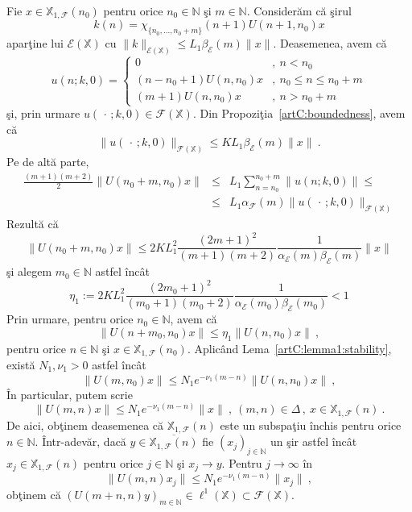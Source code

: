 \documentclass[ a4paper, 12pt]{report}
\newcommand{\E}{\mathcal{E}}
\newcommand{\F}{\mathcal{F}}
\newcommand{\N}{\mathbb{N}}
\newcommand{\X}{\mathbb{X}}
\theoremstyle{definition}
\theoremstyle{remark}
\numberwithin{equation}{section}
\begin{document}
Fie $x\in\X_{1,\F}(n_0)$ pentru orice $n_0\in\N$ \c si $m\in\N$. Consider\u am c\u a \c sirul
\begin{equation}
k(n)=\chi_{\{n_0,..., n_0+m\}}(n+1)U(n+1,n_0)x
\end{equation}
apar\c tine lui $\E(\X)$ cu $\|k\|_{\E(\X)}\leq L_1\beta_{\E}(m)\|x\|$. Deasemenea, avem c\u a
\begin{equation}
u(n;k,0) = \begin{cases}
0 &,\ n<n_0\\
(n-n_0+1) U(n,n_0)x &,\ n_0\leq n\leq n_0+m\\
(m+1) U(n,n_0)x &,\ n>n_0+m
\end{cases}
\end{equation}
\c si, prin urmare $u(\,\cdot\,;k,0)\in\F(\X)$. Din Propozi\c tia~\ref{artC:boundedness}, avem c\u a
$$\|u(\,\cdot\,;k,0)\|_{\F(\X)}\leq KL_1 \beta_{\E}(m)\|x\|\ .$$
Pe de alt\u a parte,
\begin{eqnarray*}
\frac{(m+1)(m+2)}{2}\|U(n_0+m,n_0)x\| &\leq& L_1 \sum_{n=n_0}^{n_0+m} \|u(n;k,0)\| \leq \\
&\leq&L_1\alpha_{\F}(m) \|u(\,\cdot\,;k,0)\|_{\F(\X)}
\end{eqnarray*}
Rezult\u a c\u a
\begin{equation}
\|U(n_0+m,n_0)x\|\leq 2KL_1^2 \frac{(2m+1)^2}{(m+1)(m+2)}\frac{1}{\alpha_{\E}(m)\beta_{\E}(m)}\|x\|
\end{equation}
\c si alegem $m_0\in\N$ astfel \^inc\^at
$$\eta_1:= 2KL_1^2 \frac{(2m_0+1)^2}{(m_0+1)(m_0+2)}\frac{1}{\alpha_{\E}(m_0)\beta_{\E}(m_0)} <1 $$
Prin urmare, pentru orice $n_0\in\N$, avem c\u a
$$\|U(n+m_0,n_0)x\|\leq \eta_1 \|U(n,n_0)x\|\ ,$$
pentru orice $n\in\N$ \c si $x\in\X_{1,\F}(n_0)$.
Aplic\^and Lema~\ref{artC:lemma1:stability}, exist\u a  $N_1,\nu_1>0$ astfel \^inc\^at
$$\|U(m,n_0)x\|\leq N_1e^{-\nu_1(m-n)}\|U(n,n_0)x\|\ ,$$
\^In particular, putem scrie
\begin{equation}
\|U(m,n)x\|\leq N_1e^{-\nu_1 (m-n)}\|x\|\ ,\ (m,n)\in\Delta\,,\ x\in\X_{1,\F}(n)\ .
\end{equation}
De aici, ob\c tinem deasemenea c\u a $\X_{1,\F}(n)$ este un subspa\c tiu \^inchis pentru orice $n\in\N$.
\^Intr-adev\u ar, dac\u a $y\in\overline{\X_{1,\F}(n)}$ fie $(x_j)_{j\in\N}$ un \c sir astfel \^inc\^at
$x_j\in\X_{1,\F}(n)$ pentru orice $j\in\N$ \c si $x_j\to y$. Pentru $j\to\infty$ \^in
$$\|U(m,n)x_j\|\leq N_1e^{-\nu_1 (m-n)}\|x_j\|\ ,$$
ob\c tinem c\u a  $(U(m+n,n)y)_{m\in\N}\in\ell^1(\X)\subset\F(\X)$.
\end{document}
